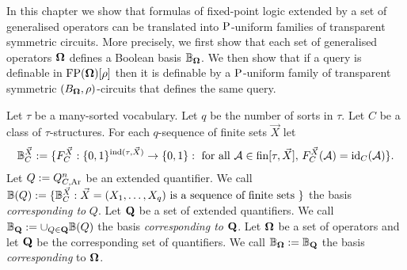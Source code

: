 \documentclass[../main/thesis.tex]{subfiles}
\begin{document}
In this chapter we show that formulas of fixed-point logic extended by a set of
generalised operators can be translated into $\mathrm{P}$-uniform families of
transparent symmetric circuits. More precisely, we first show that each set of
generalised operators $\mathbf{\mathbf{\Omega}}$ defines a Boolean basis $\mathbb{B}_{\mathbf{\mathbf{\Omega}}}$. We then
show that if a query is definable in $\text{\upshape FP}(\mathbf{\mathbf{\Omega}})[\rho]$ then it is definable by
a $\mathrm{P}$-uniform family of transparent symmetric $(B_{\mathbf{\mathbf{\Omega}}}, \rho)$-circuits
that defines the same query.

\begin{definition}
  Let $\tau$ be a many-sorted vocabulary. Let $q$ be the number of sorts in
  $\tau$. Let $C$ be a class of $\tau$-structures. For each $q$-sequence of
  finite sets $\vec{X}$ let
  \begin{align*}
    \mathbb{B}^{\vec{X}}_{C} := \{F^{\vec{X}}_{C}: \{0,1\}^{\text{\upshape ind}(\tau, \vec{X})}\rightarrow
    \{0,1\} : \text{ for all }\mathcal{A} \in \text{\upshape fin}{[\tau,
    \vec{X}]},\, F^{\vec{X}}_{C}(\mathcal{A}) = \operatorname{id}_C (\mathcal{A})\}.
  \end{align*}
  Let $Q := Q^n_{C, \text{\upshape Ar}}$ be an extended quantifier. We call $\mathbb{B}(Q) :=
  \{\mathbb{B}^{\vec{X}}_C : \vec{X} = (X_1, \ldots, X_q) \text{ is a sequence of
    finite sets } \}$ the basis \emph{corresponding to} $Q$. Let $\mathbf{Q}$ be
  a set of extended quantifiers. We call $\mathbb{B}_{\mathbf{Q}} := \cup_{Q \in
    \mathbf{Q}} \mathbb{B}(Q)$ the basis \emph{corresponding to} $\mathbf{Q}$. Let
  $\mathbf{\mathbf{\Omega}}$ be a set of operators and let $\mathbf{Q}$ be the corresponding set of
  quantifiers. We call $\mathbb{B}_{\mathbf{\mathbf{\Omega}}} := \mathbb{B}_{\mathbf{Q}}$ the basis
  \emph{corresponding} to $\mathbf{\mathbf{\Omega}}$.
\end{definition}


\end{document}

